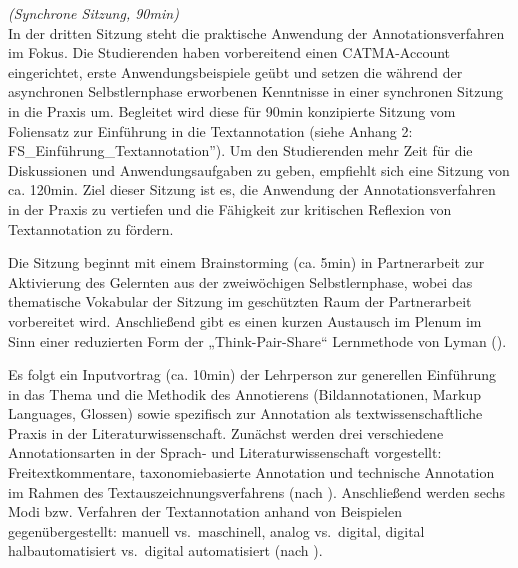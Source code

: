 \documentclass[
          a4paper,
        ]{article}
\begin{document}
\emph{(Synchrone Sitzung, 90min)}\\
In der dritten Sitzung steht die praktische Anwendung der
Annotationsverfahren im Fokus. Die Studierenden haben vorbereitend einen
CATMA-Account eingerichtet, erste Anwendungsbeispiele geübt und setzen
die während der asynchronen Selbstlernphase erworbenen Kenntnisse in
einer synchronen Sitzung in die Praxis um. Begleitet wird diese für
90min konzipierte Sitzung vom Foliensatz zur Einführung in die
Textannotation (siehe Anhang 2: FS\_Einführung\_Textannotation''). Um
den Studierenden mehr Zeit für die Diskussionen und Anwendungsaufgaben
zu geben, empfiehlt sich eine Sitzung von ca. 120min. Ziel dieser
Sitzung ist es, die Anwendung der Annotationsverfahren in der Praxis zu
vertiefen und die Fähigkeit zur kritischen Reflexion von Textannotation
zu fördern.

Die Sitzung beginnt mit einem Brainstorming (ca. 5min) in Partnerarbeit
zur Aktivierung des Gelernten aus der zweiwöchigen Selbstlernphase,
wobei das thematische Vokabular der Sitzung im geschützten Raum der
Partnerarbeit vorbereitet wird. Anschließend gibt es einen kurzen
Austausch im Plenum im Sinn einer reduzierten Form der
„Think-Pair-Share`` Lernmethode von Lyman
().

Es folgt ein Inputvortrag (ca. 10min) der Lehrperson zur generellen
Einführung in das Thema und die Methodik des Annotierens
(Bildannotationen, Markup Languages, Glossen) sowie spezifisch zur
Annotation als textwissenschaftliche Praxis in der
Literaturwissenschaft. Zunächst werden drei verschiedene
Annotationsarten in der Sprach- und Literaturwissenschaft vorgestellt:
Freitextkommentare, taxonomiebasierte Annotation und technische
Annotation im Rahmen des Textauszeichnungsverfahrens (nach
).
Anschließend werden sechs Modi bzw. Verfahren der Textannotation anhand
von Beispielen gegenübergestellt: manuell vs.~maschinell, analog
vs.~digital, digital halbautomatisiert vs.~digital automatisiert (nach
).
\end{document}
